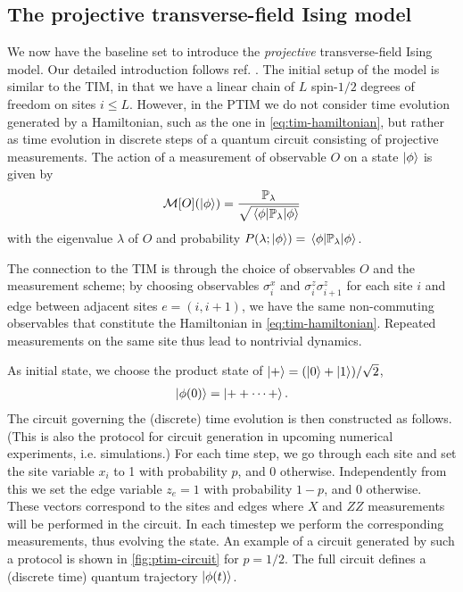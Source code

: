 \subsection{The projective transverse-field Ising model}\label{sec:the-ptim}
We now have the baseline set to introduce the \emph{projective}
transverse-field Ising model. Our detailed introduction follows ref.
\cite{langEntanglementTransitionProjective2020}. 
The initial setup of the model is similar to the
TIM, in that we have a linear chain of $L$ spin-$1 /2$ degrees of freedom on sites
$i\leq L$. However, in the PTIM we do not consider time evolution generated by
a Hamiltonian, such as the one in \cref{eq:tim-hamiltonian}, but rather as time
evolution in discrete steps of a quantum circuit consisting of projective
measurements. The action of a measurement of observable $O$ on a state
$\ket{\phi}$ is given by
\begin{align}
  \mathcal{M}[O](\ket{\phi}) =
  \frac{\mathbb{P}_\lambda}{\sqrt{\expval{\mathbb{P}_\lambda}{\phi}}}
\end{align}
with the eigenvalue $\lambda$ of $O$ and probability $P(\lambda;
\ket{\phi}) = \expval{\mathbb{P}_\lambda}{\phi}$.

The connection to the TIM is through the choice of observables $O$ and the
measurement scheme; by choosing
observables $\sigma^x_i$ and $\sigma_i^z\sigma_{i+1}^z$ for each site $i$ and
edge between adjacent sites $e=(i,i+1)$, we have the same non-commuting observables that
constitute the Hamiltonian in \cref{eq:tim-hamiltonian}. Repeated measurements
on the same site thus lead to nontrivial dynamics.

As initial state, we choose the product state of $\ket{+} = (\ket{0} + \ket{1})
/ \sqrt{2}$,
\begin{align}
  \ket{\phi(0)} = \ket{++\cdots +}
.\end{align}
The circuit governing the (discrete) time evolution is then constructed as
follows. (This is also the protocol for circuit generation in upcoming numerical
experiments, i.e. simulations.) For each time step, we go through each site and
set the site variable $x_i$ to 1 with probability $p$, and 0 otherwise.
Independently from this we set the edge variable $z_e=1$ with probability
$1-p$, and 0 otherwise. These vectors correspond to the sites and edges where
$X$ and $ZZ$ measurements will be performed in the circuit. In each timestep we
perform the corresponding measurements, thus evolving the state. An example of
a circuit generated by such a protocol is shown in \cref{fig:ptim-circuit} for
$p=1 /2$. The full circuit defines a (discrete time) quantum trajectory
$\ket{\phi(t)}$.

